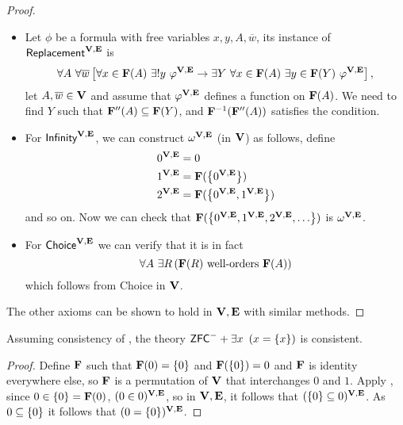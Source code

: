 \begin{proof}
\begin{itemize}
        \item Let \(\phi\) be a formula with free variables \(x,y,A,\overline{w}\), its instance of \(\textsf{Replacement}^{\mathbf{V},\mathbf{E}}\) is
            \[ \forall A~\forall \overline{w} \left[ 
                    \forall x\in\mathbf{F}(A) ~ \exists!y\ \varphi^{\mathbf{V},\mathbf{E}} \rightarrow \exists Y~ \forall x\in \mathbf{F}(A)~ \exists y\in \mathbf{F}(Y)~ \varphi^{\mathbf{V},\mathbf{E}}
                 \right],
            \]
            let \(A,\overline{w}\in \mathbf{V}\) and assume that \(\varphi^{\mathbf{V},\mathbf{E}}\) defines a function on \(\mathbf{F}(A)\).
            We need to find \(Y\) such that \(\mathbf{F}''(A) \subseteq \mathbf{F}(Y)\), and \(\mathbf{F}^{-1}(\mathbf{F}''(A))\) satisfies the condition.

        \item For \({\normalfont\textsf{Infinity}}^{\mathbf{V},\mathbf{E}}\), we can construct \(\omega^{\mathbf{V},\mathbf{E}}\) (in \(\mathbf{V}\)) as follows, define
            \begin{align*}
                0^{\mathbf{V},\mathbf{E}} &= 0 \\
                1^{\mathbf{V},\mathbf{E}} &= \mathbf{F}({\left\{ 0^{\mathbf{V},\mathbf{E}} \right\}}) \\
                2^{\mathbf{V},\mathbf{E}} &= \mathbf{F}({\left\{ 0^{\mathbf{V},\mathbf{E}}, 1^{\mathbf{V},\mathbf{E}} \right\}})
            \end{align*}
            and so on. Now we can check that \(\F(\set{0^{\V,\E},1^{\V,\E},2^{\V,\E},\dots})\) is \(\omega^{\mathbf{V},\mathbf{E}}\).

        \item For \(\textsf{Choice}^{\mathbf{V},\mathbf{E}}\) we can verify that it is in fact
            \[ \forall A~\exists R\left(\mathbf{F}(R) \text{ well-orders } \mathbf{F}(A)\right) \]
            which follows from \textsf{Choice} in \(\mathbf{V}\).
    \end{itemize}
    The other axioms can be shown to hold in \(\mathbf{V},\mathbf{E}\) with similar methods.
\end{proof}

\begin{example}\label{babyAtomExample}
    Assuming consistency of \ZFC, the theory \(\mbox{\normalfont \textsf{ZFC}}^- + \exists x~\left(x = {\left\{ x \right\}}\right)\) is consistent.
\end{example}
\begin{proof}
    Define \(\mathbf{F}\) such that \(\mathbf{F}(0) = {\left\{ 0 \right\}}\) and \(\mathbf{F}({\left\{ 0 \right\}}) = 0\) and \(\mathbf{F}\) is identity everywhere else,
    so \(\mathbf{F}\) is a permutation of \(\mathbf{V}\) that interchanges \(0\) and \(1\).
    Apply ,
    since \(0 \in {\left\{ 0 \right\}} = \mathbf{F}(0)\), \((0\in 0)^{\mathbf{V},\mathbf{E}}\),
    so in \(\mathbf{V},\mathbf{E}\), it follows that \(({\left\{ 0 \right\}} \subseteq 0)^{\mathbf{V},\mathbf{E}}\).
    As \(0 \subseteq {\left\{ 0 \right\}}\) it follows that \((0 = {\left\{ 0 \right\}})^{\mathbf{V},\mathbf{E}}\).
\end{proof}

